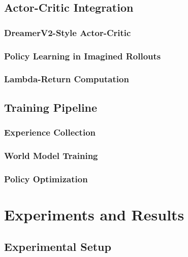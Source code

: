 \documentclass[
	english,
	ruledheaders=section,
	class=report,
	thesis={type=master},
	accentcolor=9c,
	custommargins=true,
	marginpar=false,
	parskip=half-,
	fontsize=11pt,
]{tudapub}
\begin{document}
\section{Actor-Critic Integration}
\label{sec:actor_critic}

\subsection{DreamerV2-Style Actor-Critic}
\label{subsec:dreamer_ac}

\subsection{Policy Learning in Imagined Rollouts}
\label{subsec:imagined_rollouts}

\subsection{Lambda-Return Computation}
\label{subsec:lambda_returns}

\section{Training Pipeline}
\label{sec:training_pipeline}

\subsection{Experience Collection}
\label{subsec:experience_collection}

\subsection{World Model Training}
\label{subsec:world_model_training}

\subsection{Policy Optimization}
\label{subsec:policy_optimization}

\chapter{Experiments and Results}
\label{chap:experiments}

\section{Experimental Setup}
\label{sec:exp_setup}
\end{document}
